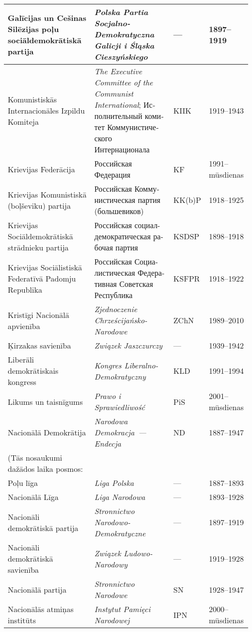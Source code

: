 \documentclass[twoside,a5paper,12pt,fleqn,openany]{extbook}
\newcommand{\pltxti}[1]{\textit{\textpolish{#1}}}
\newcommand{\rutxti}[1]{\textrussian{#1}}
\newcommand{\entxti}[1]{\textit{\textenglish{#1}}}
\begin{document}
\begin{footnotesize}
\begin{tabularx}{\linewidth}{|p{3cm}|p{3.5cm}|p{1.4cm}|p{1.6cm}|}
\hline
Galīcijas un Cešinas Silēzijas poļu sociāldemokrātiskā partija & \pltxti{Polska Partia Socjalno-Demokratyczna Galicji i Śląska Cieszyńskiego} & --- & 1897--1919 \\
\hline
Komunistiskās Internacionāles Izpildu Komiteja & \entxti{The Executive Committee of the Communist International}; \rutxti{Исполнительный комитет Коммунистического Интернационала} & KIIK & 1919--1943 \\
\hline
Krievijas Federācija & \rutxti{Российская Федерация} & KF & 1991--mūsdienas \\
\hline
Krievijas Komunistiskā (boļševiku) partija & \rutxti{Российская Коммунистическая партия (большевиков)} & KK(b)P & 1918--1925 \\
\hline
Krievijas Sociāldemokrātiskā strādnieku partija & \rutxti{Российская социал-демократическая рабочая партия} & KSDSP & 1898--1918 \\
\hline
Krievijas Sociālistiskā Federatīvā Padomju Republika & \rutxti{Российская Социалистическая Федеративная Советская Республика} & KSFPR & 1918--1922 \\
\hline
Kristīgi Nacionālā apvienība & \pltxti{Zjednoczenie Chrześcijańsko-Narodowe} & ZChN & 1989--2010 \\
\hline
Ķirzakas savienība & \pltxti{Związek Jaszczurczy} & --- & 1939--1942 \\
\hline
Liberāli demokrātiskais kongress & \pltxti{Kongres Liberalno-Demokratyczny} & KLD & 1991--1994 \\
\hline
Likums un taisnīgums & \pltxti{Prawo i Sprawiedliwość} & PiS & 2001--mūsdienas \\
\hline
Nacionālā Demokrātija & \pltxti{Narodowa Demokracja~--- Endecja} & ND & 1887--1947 \\
(Tās nosaukumi dažādos laika posmos: & ~ & ~ & ~ \\
Poļu līga & \pltxti{Liga Polska} & --- & 1887--1893 \\
Nacionālā Līga & \pltxti{Liga Narodowa} & --- & 1893--1928 \\
Nacionāli demokrātiskā partija & \pltxti{Stronnictwo Narodowo-Demokratyczne} & --- & 1897--1919 \\
Nacionāli demokrātiskā savienība & \pltxti{Związek Ludowo-Narodowy} & --- & 1919--1928 \\
Nacionālā partija & \pltxti{Stronnictwo Narodowe} & SN & 1928--1947 \\
\hline
Nacionālās atmiņas institūts & \pltxti{Instytut Pamięci Narodowej} & IPN & 2000--mūsdienas \\

\end{tabularx}
\end{footnotesize}
\end{document}
